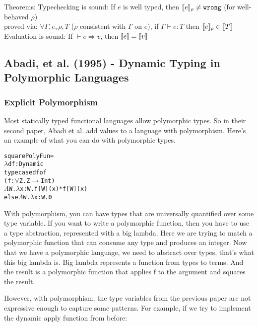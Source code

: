 \documentclass[12pt]{article}	%
\begin{document}
Theorems: Typechecking is sound: If $e$ is well typed, then $[\![e]\!]_\rho \neq \texttt{wrong}$ (for well-behaved $\rho$)\\
	                             proved via: $\forall\Gamma,e,\rho,T$ ($\rho$ consistent with $\Gamma$ on $e$), if $\Gamma\vdash e:T$ then $[\![e]\!]_\rho \in [\![T]\!]$\\
	      Evaluation is sound: If $\vdash e \Rightarrow v$, then $[\![e]\!] = [\![v]\!]$



\subsection*{Abadi, et al. (1995) - Dynamic Typing in Polymorphic Languages}

\subsubsection*{Explicit Polymorphism}
Most statically typed functional languages allow polymorphic types. So in their second paper, Abadi et al. add \Dynamic values to a language with polymorphism. Here's an example of what you can do with polymorphic types. 

\begin{alltt}
squarePolyFun = 
  \(\lambda\)df:Dynamic
    typecase df of
      (f:\(\forall\)Z.Z\(\rightarrow\)Int)
        \(\Lambda\)W.\(\lambda\)x:W.f[W](x)*f[W](x)
      else \(\Lambda\)W.\(\lambda\)x:W.0
\end{alltt}


With polymorphism, you can have types that are universally quantified over some type variable. If you want to write a polymorphic function, then you have to use a type abstraction, represented with a big lambda. Here we are trying to match a polymorphic function that can consume any type and produces an integer. Now that we have a polymorphic language, we need to abstract over types, that's what this big lambda is. Big lambda represents a function from types to terms. And the result is a polymorphic function that applies f to the argument and squares the result.


However, with polymorphism, the type variables from the previous paper are not expressive enough to capture some patterns. For example, if we try to implement the dynamic apply function from before:
\end{document}
